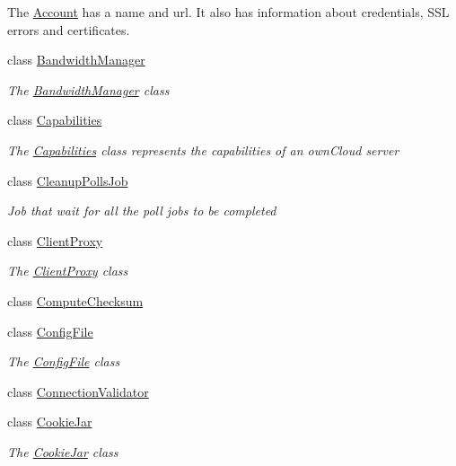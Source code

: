 \begin{DoxyCompactItemize}
\begin{DoxyCompactList}
The \hyperlink{class_o_c_c_1_1_account}{Account} has a name and url. It also has information about credentials, S\+SL errors and certificates. \end{DoxyCompactList}\item 
class \hyperlink{class_o_c_c_1_1_bandwidth_manager}{Bandwidth\+Manager}
\begin{DoxyCompactList}\small\item\em The \hyperlink{class_o_c_c_1_1_bandwidth_manager}{Bandwidth\+Manager} class \end{DoxyCompactList}\item 
class \hyperlink{class_o_c_c_1_1_capabilities}{Capabilities}
\begin{DoxyCompactList}\small\item\em The \hyperlink{class_o_c_c_1_1_capabilities}{Capabilities} class represents the capabilities of an own\+Cloud server \end{DoxyCompactList}\item 
class \hyperlink{class_o_c_c_1_1_cleanup_polls_job}{Cleanup\+Polls\+Job}
\begin{DoxyCompactList}\small\item\em Job that wait for all the poll jobs to be completed \end{DoxyCompactList}\item 
class \hyperlink{class_o_c_c_1_1_client_proxy}{Client\+Proxy}
\begin{DoxyCompactList}\small\item\em The \hyperlink{class_o_c_c_1_1_client_proxy}{Client\+Proxy} class \end{DoxyCompactList}\item 
class \hyperlink{class_o_c_c_1_1_compute_checksum}{Compute\+Checksum}
\item 
class \hyperlink{class_o_c_c_1_1_config_file}{Config\+File}
\begin{DoxyCompactList}\small\item\em The \hyperlink{class_o_c_c_1_1_config_file}{Config\+File} class \end{DoxyCompactList}\item 
class \hyperlink{class_o_c_c_1_1_connection_validator}{Connection\+Validator}
\item 
class \hyperlink{class_o_c_c_1_1_cookie_jar}{Cookie\+Jar}
\begin{DoxyCompactList}\small\item\em The \hyperlink{class_o_c_c_1_1_cookie_jar}{Cookie\+Jar} class \end{DoxyCompactList}\item 

\end{DoxyCompactItemize}
